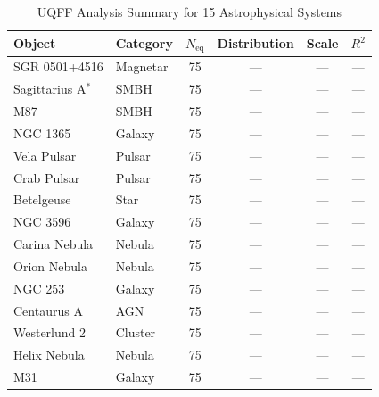 
\begin{table}[ht]
\centering
\caption{UQFF Analysis Summary for 15 Astrophysical Systems}
\label{tab:uqff_batch_summary}
\begin{tabular}{llcccc}
\toprule
Object & Category & $N_{\mathrm{eq}}$ & Distribution & Scale & $R^2$ \\
\midrule
SGR 0501+4516 & Magnetar & 75 & --- & --- & --- \\
Sagittarius A$^*$ & SMBH & 75 & --- & --- & --- \\
M87 & SMBH & 75 & --- & --- & --- \\
NGC 1365 & Galaxy & 75 & --- & --- & --- \\
Vela Pulsar & Pulsar & 75 & --- & --- & --- \\
Crab Pulsar & Pulsar & 75 & --- & --- & --- \\
Betelgeuse & Star & 75 & --- & --- & --- \\
NGC 3596 & Galaxy & 75 & --- & --- & --- \\
Carina Nebula & Nebula & 75 & --- & --- & --- \\
Orion Nebula & Nebula & 75 & --- & --- & --- \\
NGC 253 & Galaxy & 75 & --- & --- & --- \\
Centaurus A & AGN & 75 & --- & --- & --- \\
Westerlund 2 & Cluster & 75 & --- & --- & --- \\
Helix Nebula & Nebula & 75 & --- & --- & --- \\
M31 & Galaxy & 75 & --- & --- & --- \\
\bottomrule
\end{tabular}
\end{table}
